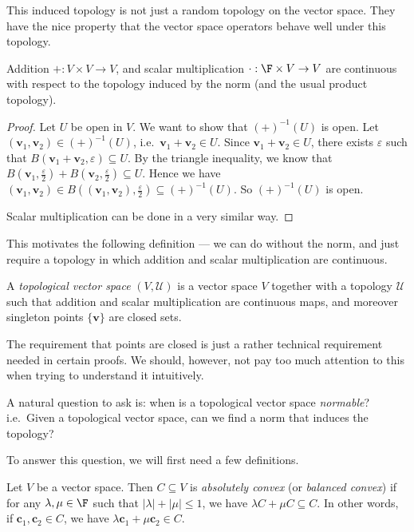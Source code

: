 \documentclass[a4paper]{article}
\begin{document}
This induced topology is not just a random topology on the vector space. They have the nice property that the vector space operators behave well under this topology.
\begin{prop}
  Addition $+: V\times V \to V$, and scalar multiplication $\cdot: \F \times V \to V$ are continuous with respect to the topology induced by the norm (and the usual product topology).
\end{prop}

\begin{proof}
  Let $U$ be open in $V$. We want to show that $(+)^{-1} (U)$ is open. Let $(\mathbf{v}_1, \mathbf{v}_2) \in (+)^{-1}(U)$, i.e.\ $\mathbf{v}_1 + \mathbf{v}_2 \in U$. Since $\mathbf{v}_1 + \mathbf{v}_2 \in U$, there exists $\varepsilon$ such that $B(\mathbf{v}_1 + \mathbf{v}_2, \varepsilon) \subseteq U$. By the triangle inequality, we know that $B(\mathbf{v}_1, \frac{\varepsilon}{2}) + B(\mathbf{v}_2, \frac{\varepsilon}{2}) \subseteq U$. Hence we have $(\mathbf{v}_1, \mathbf{v}_2) \in B\left((\mathbf{v}_1, \mathbf{v}_2), \frac{\varepsilon}{2}\right) \subseteq (+)^{-1}(U)$. So $(+)^{-1}(U)$ is open.

  Scalar multiplication can be done in a very similar way.
\end{proof}
This motivates the following definition --- we can do without the norm, and just require a topology in which addition and scalar multiplication are continuous.
\begin{defi}
  A \emph{topological vector space} $(V, \mathcal{U})$ is a vector space $V$ together with a topology $\mathcal{U}$ such that addition and scalar multiplication are continuous maps, and moreover singleton points $\{\mathbf{v}\}$ are closed sets.
\end{defi}
The requirement that points are closed is just a rather technical requirement needed in certain proofs. We should, however, not pay too much attention to this when trying to understand it intuitively.

A natural question to ask is: when is a topological vector space \emph{normable}? i.e.\ Given a topological vector space, can we find a norm that induces the topology?

To answer this question, we will first need a few definitions.

\begin{defi}
  Let $V$ be a vector space. Then $C\subseteq V$ is \emph{absolutely convex} (or \emph{balanced convex}) if for any $\lambda, \mu \in \F$ such that $|\lambda| + |\mu| \leq 1$, we have $\lambda C + \mu C \subseteq C$. In other words, if $\mathbf{c}_1, \mathbf{c}_2 \in C$, we have $\lambda \mathbf{c}_1 + \mu \mathbf{c}_2 \in C$.
\end{defi}
\end{document}
